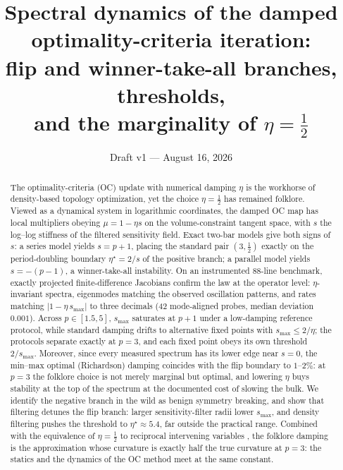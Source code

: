 \documentclass[11pt,a4paper]{article}
\title{Spectral dynamics of the damped optimality-criteria iteration:\\
flip and winner-take-all branches, thresholds,\\
and the marginality of $\eta=\tfrac12$}
\author{\todo{author list and affiliations}}
\date{Draft v1 --- August 16, 2026}
\newcommand{\smax}{s_{\max}}
\newcommand{\etastar}{\eta^{\star}}
\begin{document}
\maketitle

\begin{abstract}
The optimality-criteria (OC) update with numerical damping $\eta$ is the
workhorse of density-based topology optimization, yet the choice
$\eta=\tfrac12$ has remained folklore. Viewed as a dynamical system in
logarithmic coordinates, the damped OC map has local multipliers obeying
$\mu = 1-\eta s$ on the volume-constraint tangent space, with $s$ the
log--log stiffness of the filtered sensitivity field. Exact two-bar models
give both signs of $s$: a series model yields $s=p{+}1$, placing the
standard pair $(3,\tfrac12)$ exactly on the period-doubling boundary
$\etastar=2/s$ of the positive branch; a parallel model yields
$s=-(p{-}1)$, a winner-take-all instability. On an instrumented 88-line
benchmark, exactly projected finite-difference Jacobians confirm the law
at the operator level: $\eta$-invariant spectra, eigenmodes matching the
observed oscillation patterns, and rates matching $|1-\eta\,\smax|$ to
three decimals (42 mode-aligned probes, median deviation $0.001$). Across
$p\in[1.5,5]$, $\smax$ saturates at $p{+}1$ under a low-damping reference
protocol, while standard damping drifts to alternative fixed points with
$\smax\le 2/\eta$; the protocols separate exactly at $p=3$, and each fixed
point obeys its own threshold $2/\smax$. Moreover, since every measured
spectrum has its lower edge near $s=0$, the min--max optimal (Richardson)
damping coincides with the flip boundary to $1$--$2\%$: at $p=3$ the
folklore choice is not merely marginal but optimal, and lowering $\eta$
buys stability at the top of the spectrum at the documented cost of
slowing the bulk. We identify the negative branch
in the wild as benign symmetry breaking, and show that filtering detunes
the flip branch: larger sensitivity-filter radii lower $\smax$, and
density filtering pushes the threshold to $\etastar\approx5.4$, far
outside the practical range. Combined with the equivalence of
$\eta=\tfrac12$ to reciprocal intervening variables
\citep{groenwold2008}, the folklore damping is the approximation whose
curvature is exactly half the true curvature at $p=3$: the statics and the
dynamics of the OC method meet at the same constant.
\end{abstract}

\end{document}
